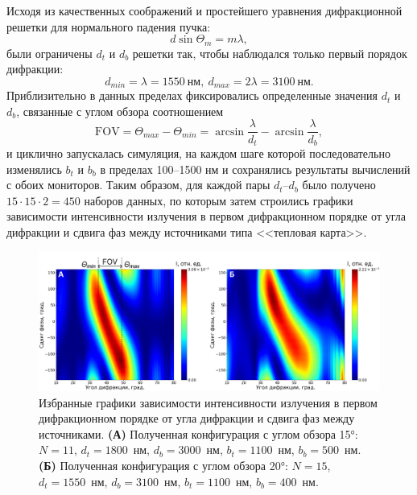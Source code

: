 Исходя из качественных соображений и простейшего уравнения дифракционной решетки для нормального падения пучка:
\begin{equation}
    d\sin\Theta_m = m\lambda,
    \label{eq:simpleGrating}
\end{equation}
были ограничены $d_t$ и $d_b$ решетки так, чтобы наблюдался только первый порядок дифракции:
\begin{equation}
    d_{min} = \lambda = 1550\ \text{нм},\ d_{max} = 2\lambda = 3100\ \text{нм}.
\end{equation}
Приблизительно в данных пределах фиксировались определенные значения $d_t$ и $d_b$, связанные с углом обзора соотношением
\begin{equation}
    \mathrm{FOV} = \Theta_{max} - \Theta_{min} = \arcsin{\frac{\lambda}{d_t}} - \arcsin{\frac{\lambda}{d_b}},
    \label{eq:fov}
\end{equation}
и циклично запускалась симуляция, на каждом шаге которой последовательно изменялись $b_t$ и $b_b$ в пределах 100--1500 нм и сохранялись результаты вычислений с обоих мониторов. Таким образом, для каждой пары $d_t$--$d_b$ было получено \mbox{$15 \cdot 15 \cdot 2 = 450$} наборов данных, по которым затем строились графики зависимости интенсивности излучения в первом дифракционном порядке от угла дифракции и сдвига фаз между источниками типа <<тепловая карта>>.

\begin{figure}
    \includegraphics[width=\textwidth]{pictures/Heatmaps.png}
    \caption{Избранные графики зависимости интенсивности излучения в первом дифракционном порядке от угла дифракции и сдвига фаз между источниками. \textbf{(А)} Полученная конфигурация с углом обзора 15°: $N = 11$, $d_t = 1800$~нм, $d_b = 3000$~нм, $b_t = 1100$~нм, $b_b = 500$~нм. \textbf{(Б)} Полученная конфигурация с углом обзора 20°: $N = 15$, $d_t = 1550$~нм, $d_b = 3100$~нм, $b_t = 1100$~нм, $b_b = 400$~нм. }
\end{figure}

